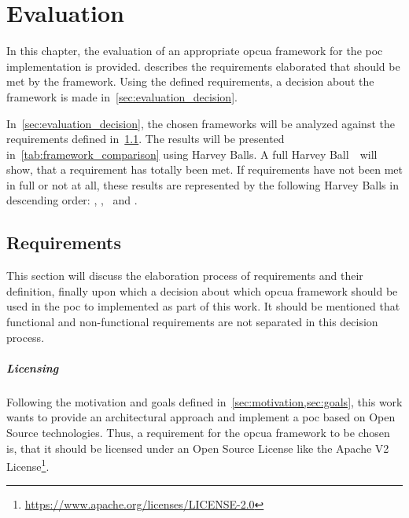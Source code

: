 \documentclass[
a4paper,
twoside,
headsepline,
cleardoublepage=empty,
parskip=half,
draft=false
]{scrbook}
\begin{document}
	\chapter{Evaluation}\label{ch:evaluation}
	
		In this chapter, the evaluation of an appropriate \gls{opcua} framework for the \gls{poc} implementation is provided.  describes the requirements elaborated that should be met by the framework. 
		Using the defined requirements, a decision about the framework is made in~\cref{sec:evaluation_decision}.
		
		In~\cref{sec:evaluation_decision}, the chosen frameworks will be analyzed against the requirements defined in~\cref{sec:evaluation_requirements}. The results will be presented in~\cref{tab:framework_comparison} using Harvey Balls. 
		A full Harvey Ball~\harveyBallFull~will show, that a requirement has totally been met.
		If requirements have not been met in full or not at all, these results are represented by the following Harvey Balls in descending order: \harveyBallThreeQuarter, \harveyBallHalf, \harveyBallQuarter~and \harveyBallNone.
		
		\section{Requirements}\label{sec:evaluation_requirements}
		
			This section will discuss the elaboration process of requirements and their definition, finally upon which a decision about which \gls{opcua} framework should be used in the \gls{poc} to implemented as part of this work. 
			It should be mentioned that functional and non-functional requirements are not separated in this decision process.
			
			\paragraph{Licensing} Following the motivation and goals defined in~\cref{sec:motivation,sec:goals}, this work wants to provide an architectural approach and implement a \gls{poc} based on Open Source technologies.
			Thus, a requirement for the \gls{opcua} framework to be chosen is, that it should be licensed under an Open Source License like the Apache V2 License\footnote{\url{https://www.apache.org/licenses/LICENSE-2.0}}.
			
\end{document}
